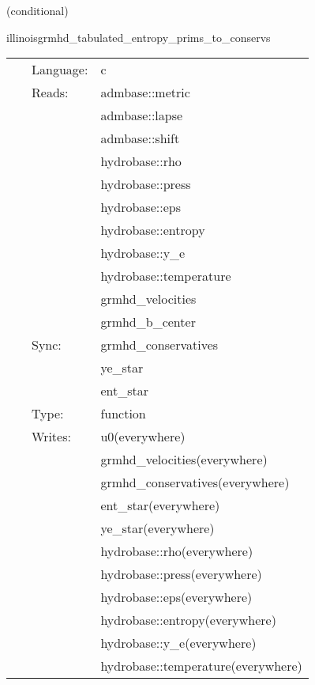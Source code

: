 \documentclass{article}
\begin{document}
   (conditional) 

\hspace{5mm} illinoisgrmhd\_tabulated\_entropy\_prims\_to\_conservs 

\hspace{5mm}{\it entropy+tabulated version of illinoisgrmhd\_prims\_to\_conservs } 


\hspace{5mm}

 \begin{tabular*}{160mm}{cll} 
~ & Language:  & c \\ 
~ & Reads:  & admbase::metric \\ 
~& ~ &admbase::lapse\\ 
~& ~ &admbase::shift\\ 
~& ~ &hydrobase::rho\\ 
~& ~ &hydrobase::press\\ 
~& ~ &hydrobase::eps\\ 
~& ~ &hydrobase::entropy\\ 
~& ~ &hydrobase::y\_e\\ 
~& ~ &hydrobase::temperature\\ 
~& ~ &grmhd\_velocities\\ 
~& ~ &grmhd\_b\_center\\ 
~ & Sync:  & grmhd\_conservatives \\ 
~& ~ &ye\_star\\ 
~& ~ &ent\_star\\ 
~ & Type:  & function \\ 
~ & Writes:  & u0(everywhere) \\ 
~& ~ &grmhd\_velocities(everywhere)\\ 
~& ~ &grmhd\_conservatives(everywhere)\\ 
~& ~ &ent\_star(everywhere)\\ 
~& ~ &ye\_star(everywhere)\\ 
~& ~ &hydrobase::rho(everywhere)\\ 
~& ~ &hydrobase::press(everywhere)\\ 
~& ~ &hydrobase::eps(everywhere)\\ 
~& ~ &hydrobase::entropy(everywhere)\\ 
~& ~ &hydrobase::y\_e(everywhere)\\ 
~& ~ &hydrobase::temperature(everywhere)\\ 
\end{tabular*} 


\vspace{5mm}
\end{document}
